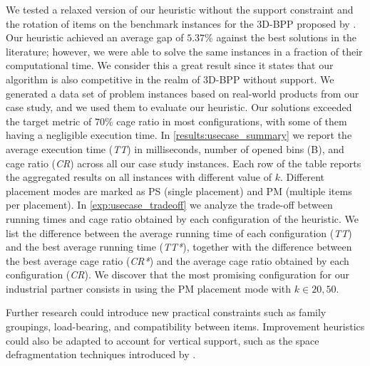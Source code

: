 \documentclass[11pt,a4paper,twocolumn]{article}
\begin{document}
We tested a relaxed version of our heuristic without the support constraint and the rotation of items on the benchmark instances for the 3D-BPP proposed by \cite{martello2000three}.
Our heuristic achieved an average gap of $5.37\%$ against the best solutions in the literature; however, we were able to solve the same instances in a fraction of their computational time.
We consider this a great result since it states that our algorithm is also competitive in the realm of 3D-BPP without support.
We generated a data set of problem instances based on real-world products from our case study, and we used them to evaluate our heuristic.
Our solutions exceeded the target metric of $70\%$ cage ratio in most configurations, with some of them having a negligible execution time.
In \cref{results:usecase_summary} we report the average execution time (\textit{TT}) in milliseconds, number of opened bins (B), and cage ratio (\textit{CR}) across all our case study instances. Each row of the table reports the aggregated results on all instances with different value of $k$.
Different placement modes are marked as PS (single placement) and PM (multiple items per placement).
In \cref{exp:usecase_tradeoff} we analyze the trade-off between running times and cage ratio obtained by each configuration of the heuristic.
We list the difference between the average running time of each configuration (\textit{TT}) and the best average running time (\textit{TT*}), together with the difference between the best average cage ratio (\textit{CR*}) and the average cage ratio obtained by each configuration (\textit{CR}).
We discover that the most promising configuration for our industrial partner consists in using the PM placement mode with $k \in {20, 50}$.

Further research could introduce new practical constraints such as family groupings, load-bearing, and compatibility between items.
Improvement heuristics could also be adapted to account for vertical support, such as the space defragmentation techniques introduced by \cite{ZHU2012452}.



\end{document}
